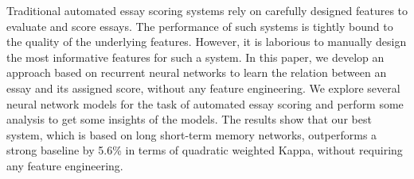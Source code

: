 Traditional automated essay scoring systems rely on carefully designed features to evaluate and score essays. The performance of such systems is tightly bound to the quality of the underlying features. However, it is laborious to manually design the most informative features for such a system. In this paper, we develop an approach based on recurrent neural networks to learn the relation between an essay and its assigned score, without any feature engineering. We explore several neural network models for the task of automated essay scoring and perform some analysis to get some insights of the models. The results show that our best system, which is based on long short-term memory networks, outperforms a strong baseline by 5.6\% in terms of quadratic weighted Kappa, without requiring any feature engineering.
